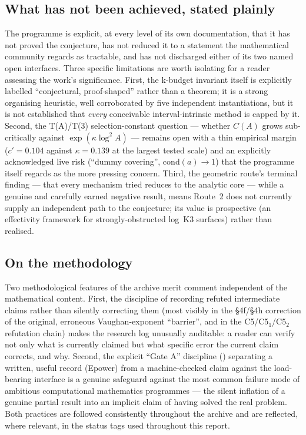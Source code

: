 \documentclass[11pt]{article}
\theoremstyle{plain}
\theoremstyle{definition}
\theoremstyle{remark}
\renewcommand{\_}{\textunderscore\allowbreak}
\begin{document}
\subsection{What has not been achieved, stated plainly}

The programme is explicit, at every level of its own documentation, that it has not proved the
conjecture, has not reduced it to a statement the mathematical community regards as tractable,
and has not discharged either of its two named open interfaces. Three specific limitations are
worth isolating for a reader assessing the work's significance. First, the k-budget invariant
itself is explicitly labelled ``conjectural, proof-shaped'' rather than a theorem; it is a
strong organising heuristic, well corroborated by five independent instantiations, but it is not
established that \emph{every} conceivable interval-intrinsic method is capped by it. Second, the
T(A)/T(3) selection-constant question — whether $C(A)$ grows sub-critically against
$\exp(\kappa\log^2A)$ — remains open with a thin empirical margin ($c'=0.104$ against
$\kappa=0.139$ at the largest tested scale) and an explicitly acknowledged live risk (``dummy
covering'', $\mathrm{cond}(a)\to1$) that the programme itself regards as the more pressing
concern. Third, the geometric route's terminal finding — that every mechanism tried reduces to
the analytic core — while a genuine and carefully earned negative result, means Route~2 does not
currently supply an independent path to the conjecture; its value is prospective (an
effectivity framework for strongly-obstructed log~K3 surfaces) rather than realised.

\subsection{On the methodology}

Two methodological features of the archive merit comment independent of the mathematical
content. First, the discipline of recording refuted intermediate claims rather than silently
correcting them (most visibly in the \S4f/\S4h correction of the original, erroneous
Vaughan-exponent ``barrier'', and in the C5/C5$_1$/C5$_2$ refutation chain) makes the research
log unusually auditable: a reader can verify not only what is currently claimed but what
specific error the current claim corrects, and why. Second, the explicit ``Gate A'' discipline
() separating a written, useful record (E\_power) from a machine-checked claim
against the load-bearing interface is a genuine safeguard against the most common failure mode
of ambitious computational mathematics programmes — the silent inflation of a genuine partial
result into an implicit claim of having solved the real problem. Both practices are followed
consistently throughout the archive and are reflected, where relevant, in the status tags used
throughout this report.
\end{document}
